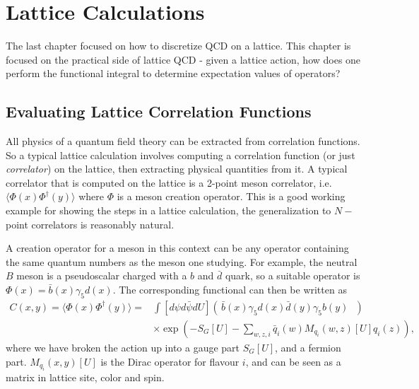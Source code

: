 \chapter{Lattice Calculations}
\label{chap:latticecalculations}

The last chapter focused on how to discretize QCD on a lattice. This chapter is focused on the practical side of lattice QCD - given a lattice action, how does one perform the functional integral to determine expectation values of operators?

\section{Evaluating Lattice Correlation Functions}

All physics of a quantum field theory can be extracted from correlation functions. So a typical lattice calculation involves computing a correlation function (or just {\it{correlator}}) on the lattice, then extracting physical quantities from it. A typical correlator that is computed on the lattice is a 2-point meson correlator, i.e. $\langle\Phi(x)\Phi^{\dagger}(y)\rangle$ where $\Phi$ is a meson creation operator. This is a good working example for showing the steps in a lattice calculation, the generalization to $N-$point correlators is reasonably natural.

A creation operator for a meson in this context can be any operator containing the same quantum numbers as the meson one studying. For example, the neutral $B$ meson is a pseudoscalar charged with a $b$ and $\bar{d}$ quark, so a suitable operator is $\Phi(x) = \bar{b}(x)\gamma_5 d(x)$. The corresponding functional can then be written as
\begin{align}
  \nonumber
  C(x,y) = \langle \Phi(x)\Phi^{\dagger}(y)\rangle =& \int [d\psi d\bar{\psi} dU] \left(\, \bar{b}(x)\gamma_5 d(x) \bar{d}(y)\gamma_5 b(y) \text{ }\right) \\&\times \exp\left(-S_G[U]-\sum_{w,z,i} \bar{q}_i(w)M_{q_i}(w,z)[U]q_i(z)\right),
\end{align}
where we have broken the action up into a gauge part $S_G[U]$, and a fermion part. $M_{q_i}(x,y)[U]$ is the Dirac operator for flavour $i$, and can be seen as a matrix in lattice site, color and spin.

